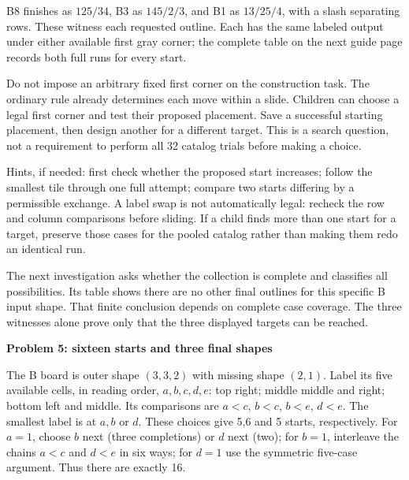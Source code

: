 \documentclass[11pt]{article}
\newcommand{\heading}[1]{\par\textbf{#1}\par}
\begin{document}
B8 finishes as $125/34$, B3 as $145/2/3$, and B1 as $13/25/4$, with a slash separating rows. These witness each requested outline. Each has the same labeled output under either available first gray corner; the complete table on the next guide page records both full runs for every start.

Do not impose an arbitrary fixed first corner on the construction task. The ordinary rule already determines each move within a slide. Children can choose a legal first corner and test their proposed placement. Save a successful starting placement, then design another for a different target. This is a search question, not a requirement to perform all 32 catalog trials before making a choice.

Hints, if needed: first check whether the proposed start increases; follow the smallest tile through one full attempt; compare two starts differing by a permissible exchange. A label swap is not automatically legal: recheck the row and column comparisons before sliding. If a child finds more than one start for a target, preserve those cases for the pooled catalog rather than making them redo an identical run.

The next investigation asks whether the collection is complete and classifies all possibilities. Its table shows there are no other final outlines for this specific B input shape. That finite conclusion depends on complete case coverage. The three witnesses alone prove only that the three displayed targets can be reached.
\newpage
\heading{Problem 5: sixteen starts and three final shapes}
The B board is outer shape $(3,3,2)$ with missing shape $(2,1)$. Label its five available cells, in reading order, $a,b,c,d,e$: top right; middle middle and right; bottom left and middle. Its comparisons are $a<c$, $b<c$, $b<e$, $d<e$. The smallest label is at $a,b$ or $d$. These choices give 5,6 and 5 starts, respectively. For $a=1$, choose $b$ next (three completions) or $d$ next (two); for $b=1$, interleave the chains $a<c$ and $d<e$ in six ways; for $d=1$ use the symmetric five-case argument. Thus there are exactly 16.
\end{document}
